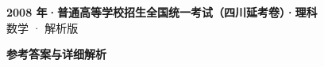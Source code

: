 \documentclass[zihao=-4, a4paper]{ctexart}
\begin{document}
\begin{center}
  {\Large\bfseries 2008 年·普通高等学校招生全国统一考试（四川延考卷）·理科}\\[4pt]
  {\large 数学 · 解析版}
\end{center}
\medskip
{}

\clearpage
{}
\begin{center}{\Large\bfseries 参考答案与详细解析}\end{center}
\medskip

\end{document}
